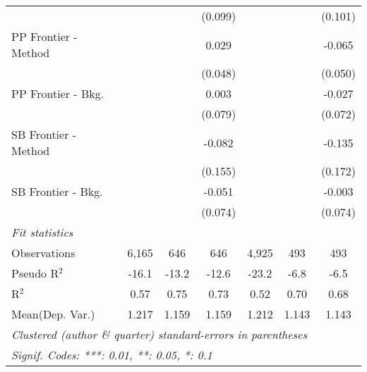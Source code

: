 \begin{tabular}{lcccccc}
                        &         &               & (0.099)       &         &              & (0.101)\\   
   PP Frontier - Method &         &               & 0.029         &         &              & -0.065\\   
                        &         &               & (0.048)       &         &              & (0.050)\\   
   PP Frontier - Bkg.   &         &               & 0.003         &         &              & -0.027\\   
                        &         &               & (0.079)       &         &              & (0.072)\\   
   SB Frontier - Method &         &               & -0.082        &         &              & -0.135\\   
                        &         &               & (0.155)       &         &              & (0.172)\\   
   SB Frontier - Bkg.   &         &               & -0.051        &         &              & -0.003\\   
                        &         &               & (0.074)       &         &              & (0.074)\\   
   \midrule
   \emph{Fit statistics}\\
   Observations         & 6,165   & 646           & 646           & 4,925   & 493          & 493\\  
   Pseudo R$^2$         & -16.1   & -13.2         & -12.6         & -23.2   & -6.8         & -6.5\\  
   R$^2$                & 0.57    & 0.75          & 0.73          & 0.52    & 0.70         & 0.68\\  
Mean(Dep. Var.) & 1.217 & 1.159 & 1.159 & 1.212 & 1.143 & 1.143 \\
   \midrule \midrule
   \multicolumn{7}{l}{\emph{Clustered (author \& quarter) standard-errors in parentheses}}\\
   \multicolumn{7}{l}{\emph{Signif. Codes: ***: 0.01, **: 0.05, *: 0.1}}\\
\end{tabular}
\par\endgroup
